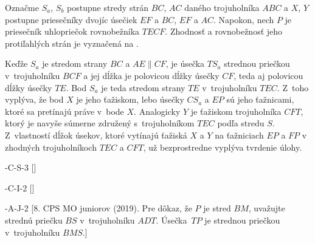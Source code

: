 {%
Označme $S_a$, $S_b$ postupne stredy strán $BC$, $AC$
daného trojuholníka $ABC$ a $X$, $Y$ postupne priesečníky dvojíc
úsečiek $EF$ a $BC$, $EF$ a $AC$.
Napokon, nech $P$ je priesečník uhlopriečok rovnobežníka $TECF$.
Zhodnosť a rovnobežnosť jeho protiľahlých strán je vyznačená na
\obr.
%


Keďže $S_a$ je stredom strany $BC$ a $AE\parallel CF$, je
úsečka $TS_a$ strednou priečkou v~trojuholníku $BCF$ a jej dĺžka je
polovicou dĺžky úsečky $CF$, teda aj polovicou dĺžky úsečky $TE$.
Bod $S_a$ je teda stredom strany $TE$ v~trojuholníku $TEC$.
Z~toho vyplýva, že bod $X$ je jeho ťažiskom, lebo úsečky $CS_a$
a $EP$ sú jeho ťažnicami, ktoré sa pretínajú práve v~bode $X$.
Analogicky $Y$ je ťažiskom trojuholníka $CFT$, ktorý je navyše
súmerne združený s~trojuholníkom $TEC$ podľa stredu $S$. Z~vlastností dĺžok úsekov,
ktoré vytínajú ťažiská $X$ a $Y$ na ťažniciach $EP$ a $FP$ v zhodných
trojuholníkoch $TEC$ a $CFT$, už bezprostredne vyplýva tvrdenie úlohy.


-C-S-3
[]

-C-I-2
[]

-A-J-2
[8. CPS MO juniorov (2019). Pre dôkaz, že $P$ je stred
$BM$, uvažujte strednú priečku $BS$
v~trojuholníku $ADT$. Úsečka~$TP$ je strednou priečkou
v~trojuholníku $BMS$.]

}

